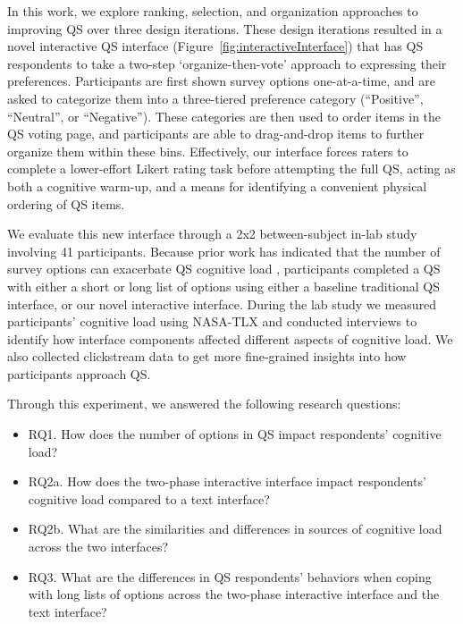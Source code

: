 In this work, we explore ranking, selection, and organization approaches to improving QS over three design iterations. These design iterations resulted in a novel interactive QS interface (Figure~\ref{fig:interactiveInterface}) that has QS respondents to take a two-step `organize-then-vote' approach to expressing their preferences. Participants are first shown survey options one-at-a-time, and are asked to categorize them into a three-tiered preference category (``Positive'', ``Neutral'', or ``Negative''). These categories are then used to order items in the QS voting page, and participants are able to drag-and-drop items to further organize them within these bins. Effectively, our interface forces raters to complete a lower-effort Likert rating task before attempting the full QS, acting as both a cognitive warm-up, and a means for identifying a convenient physical ordering of QS items.

We evaluate this new interface through a 2x2 between-subject in-lab study involving 41 participants. Because prior work has indicated that the number of survey options can exacerbate QS cognitive load \cite{lenznerCognitiveBurdenSurvey2010, blessAskingDifficultQuestions1992}, participants completed a QS with either a short or long list of options using either a baseline traditional QS interface, or our novel interactive interface. During the lab study we measured participants' cognitive load using NASA-TLX and conducted interviews to identify how interface components affected different aspects of cognitive load. We also collected clickstream data to get more fine-grained insights into how participants approach QS. 

Through this experiment, we answered the following research questions:

\begin{itemize}
    \item RQ1. How does the number of options in QS impact respondents' cognitive load?
    \item RQ2a. How does the two-phase interactive interface impact respondents' cognitive load compared to a text interface?
    \item RQ2b. What are the similarities and differences in sources of cognitive load across the two interfaces?
    \item RQ3. What are the differences in QS respondents' behaviors when coping with long lists of options across the two-phase interactive interface and the text interface?
\end{itemize}



